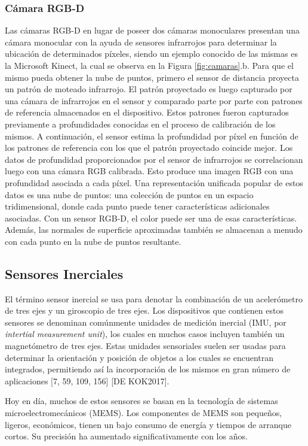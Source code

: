 \ifimagenes
\else
\subsubsection{Cámara RGB-D}
Las cámaras RGB-D\cite{hogman2011} en lugar de poseer dos cámaras monoculares presentan una cámara monocular con la ayuda de sensores infrarrojos para determinar la ubicación de determinados píxeles, siendo un ejemplo conocido de las mismas es la Microsoft Kinect, la cual se observa en la Figura \ref{fig:camaras}.b. Para que el mismo pueda obtener la nube de puntos, primero el sensor de distancia proyecta un patrón de moteado infrarrojo. El patrón proyectado es luego capturado por una cámara de infrarrojos en el sensor y comparado parte por parte con patrones de referencia almacenados en el dispositivo. Estos patrones fueron capturados previamente a profundidades conocidas en el proceso de calibración de los mismos. A continuación, el sensor estima la profundidad por píxel en función de los patrones de referencia con los que el patrón proyectado coincide mejor. Los datos de profundidad proporcionados por el sensor de infrarrojos se correlacionan luego con una cámara RGB calibrada. Esto produce una imagen RGB con una profundidad asociada a cada píxel. Una representación unificada popular de estos datos es una nube de puntos: una colección de puntos en un espacio tridimensional, donde cada punto puede tener características adicionales asociadas. Con un sensor RGB-D, el color puede ser una de esas características. Además, las normales de superficie aproximadas también se almacenan a menudo con cada punto en la nube de puntos resultante.
\subsection{Sensores Inerciales}
El término sensor inercial se usa para denotar la combinación de un acelerómetro de tres ejes y un giroscopio de tres ejes. Los dispositivos que contienen estos sensores se denominan comúnmente unidades de medición inercial (IMU, por \textit{intertial measurement unit}), los cuales en muchos casos incluyen también un magnetómetro de tres ejes. Estas unidades sensoriales suelen ser usadas para determinar la orientación y posición de objetos a los cuales se encuentran integrados, permitiendo así la incorporación de los mismos en gran número de aplicaciones [7, 59, 109, 156] [DE KOK2017].

Hoy en día, muchos de estos sensores se basan en la tecnología de sistemas microelectromecánicos (MEMS). Los componentes de MEMS son pequeños, ligeros, económicos, tienen un bajo consumo de energía y tiempos de arranque cortos. Su precisión ha aumentado significativamente con los años.

